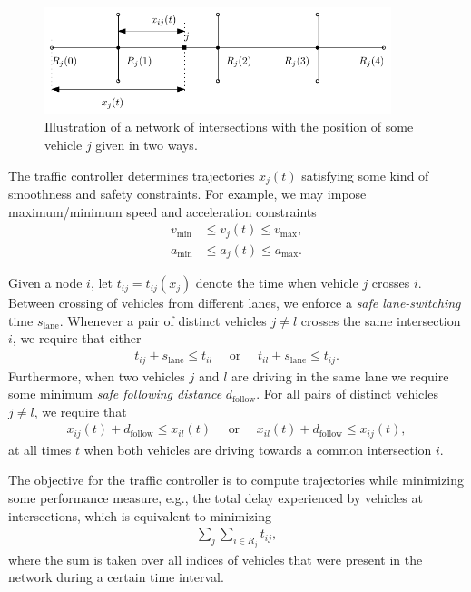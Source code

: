 \documentclass{article}
\begin{document}
\begin{figure}[b]
  \centering
  \includegraphics[width=0.9\textwidth]{figures/general_traffic_model.pdf}
  \caption{Illustration of a network of intersections with the position of some
    vehicle $j$ given in two ways.}
  \label{fig:general-model}
\end{figure}

The traffic controller determines trajectories $x_{j}(t)$
satisfying some kind of smoothness and safety constraints. For example, we may
impose maximum/minimum speed and acceleration constraints
\begin{align}
    v_\text{min} & \leq v_j(t) \leq v_\text{max} , \\
    a_\text{min} & \leq a_j(t) \leq a_\text{max} .
\end{align}


Given a node $i$, let $t_{ij} = t_{ij}(x_{j})$ denote the time when vehicle $j$
crosses $i$. Between crossing of vehicles from different lanes, we enforce a
\textit{safe lane-switching} time $s_{\text{lane}}$. Whenever a pair of distinct
vehicles $j \neq l$ crosses the same intersection $i$, we require that either
\begin{align}
  t_{ij} + s_{\text{lane}} \leq t_{il} \quad \text{ or } \quad t_{il} + s_{\text{lane}} \leq t_{ij} .
\end{align}
Furthermore, when two vehicles $j$ and $l$ are driving in the same lane we
require some minimum \textit{safe following distance} $d_{\text{follow}}$. For
all pairs of distinct vehicles $j \neq l$, we require that
\begin{align}
  \label{eq:following-distance-constraint}
  x_{ij}(t) + d_{\text{follow}} \leq x_{il}(t) \quad \text{ or } \quad x_{il}(t) + d_{\text{follow}} \leq x_{ij}(t) ,
\end{align}
at all times $t$ when both vehicles are driving towards a common intersection $i$.

The objective for the traffic controller is to compute trajectories while
minimizing some performance measure, e.g., the total delay experienced by
vehicles at intersections, which is equivalent to minimizing
\begin{align}
  \label{eq:obj}
  \sum_{j} \sum_{i \in R_{j}} t_{ij} ,
\end{align}
where the sum is taken over all indices of vehicles that were present in the
network during a certain time interval.
\end{document}

